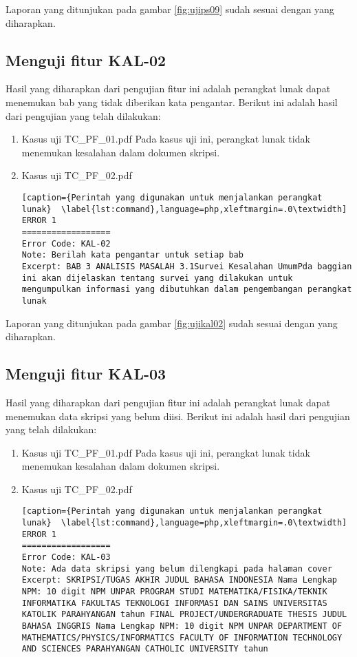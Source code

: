 Laporan yang ditunjukan pada gambar \ref{fig:ujips09} sudah sesuai dengan yang diharapkan.

\subsection{Menguji fitur KAL-02}
Hasil yang diharapkan dari pengujian fitur ini adalah perangkat lunak dapat menemukan bab yang tidak diberikan kata pengantar. Berikut ini adalah hasil dari pengujian yang telah dilakukan:

\begin{enumerate}
	\item Kasus uji TC\_PF\_01.pdf
	Pada kasus uji ini, perangkat lunak tidak menemukan kesalahan dalam dokumen skripsi.
	
	\item Kasus uji TC\_PF\_02.pdf
	
\begin{lstlisting}[caption={Perintah yang digunakan untuk menjalankan perangkat lunak}	\label{lst:command},language=php,xleftmargin=.0\textwidth]
ERROR 1
==================
Error Code: KAL-02
Note: Berilah kata pengantar untuk setiap bab
Excerpt: BAB 3 ANALISIS MASALAH 3.1Survei Kesalahan UmumPda baggian ini akan dijelaskan tentang survei yang dilakukan untuk mengumpulkan informasi yang dibutuhkan dalam pengembangan perangkat lunak
\end{lstlisting}
\end{enumerate}

Laporan yang ditunjukan pada gambar \ref{fig:ujikal02} sudah sesuai dengan yang diharapkan.

\subsection{Menguji fitur KAL-03}
Hasil yang diharapkan dari pengujian fitur ini adalah perangkat lunak dapat menemukan data skripsi yang belum diisi. Berikut ini adalah hasil dari pengujian yang telah dilakukan:

\begin{enumerate}
	\item Kasus uji TC\_PF\_01.pdf
	Pada kasus uji ini, perangkat lunak tidak menemukan kesalahan dalam dokumen skripsi.
	
	\item Kasus uji TC\_PF\_02.pdf
	
\begin{lstlisting}[caption={Perintah yang digunakan untuk menjalankan perangkat lunak}	\label{lst:command},language=php,xleftmargin=.0\textwidth]
ERROR 1
==================
Error Code: KAL-03
Note: Ada data skripsi yang belum dilengkapi pada halaman cover
Excerpt: SKRIPSI/TUGAS AKHIR JUDUL BAHASA INDONESIA Nama Lengkap NPM: 10 digit NPM UNPAR PROGRAM STUDI MATEMATIKA/FISIKA/TEKNIK INFORMATIKA FAKULTAS TEKNOLOGI INFORMASI DAN SAINS UNIVERSITAS KATOLIK PARAHYANGAN tahun FINAL PROJECT/UNDERGRADUATE THESIS JUDUL BAHASA INGGRIS Nama Lengkap NPM: 10 digit NPM UNPAR DEPARTMENT OF MATHEMATICS/PHYSICS/INFORMATICS FACULTY OF INFORMATION TECHNOLOGY AND SCIENCES PARAHYANGAN CATHOLIC UNIVERSITY tahun 
\end{lstlisting}
\end{enumerate}

